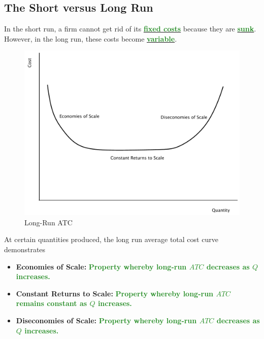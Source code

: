 \documentclass[11pt]{article}\usepackage[]{graphicx}\usepackage[]{color}
\theoremstyle{definition}
\newcommand{\ddp}[1]{{\textbf{\textcolor{ForestGreen}{#1}}}}
\newcommand{\dd}[1]{{\underline{\textbf{\textcolor{ForestGreen}{#1}}}}}
\newcommand{\defn}[1]{\textbf{#1}}
\begin{document}
	\subsection{The Short versus Long Run}
	
	In the short run, a firm cannot get rid of its \dd{fixed costs} because they are \dd{sunk}. However, in the long run, these costs become \dd{variable}.
	
	
		\begin{figure}[H]
			\centering
			\includegraphics[scale=.35]{plot60.pdf}
			\caption{Long-Run ATC}
		\end{figure}
	
	At certain quantities produced, the long run average total cost curve demonstrates
	\begin{itemize}
		\itemsep1em 
		\item \defn{Economies of Scale:} \ddp{Property whereby long-run $ATC$ decreases as $Q$ increases.}
		\item \defn{Constant Returns to Scale:} \ddp{Property whereby long-run $ATC$ remains constant as $Q$ increases.}
		\item \defn{Diseconomies of Scale:}  \ddp{Property whereby long-run $ATC$ decreases as $Q$ increases.}
	\end{itemize}
	
\end{document}
